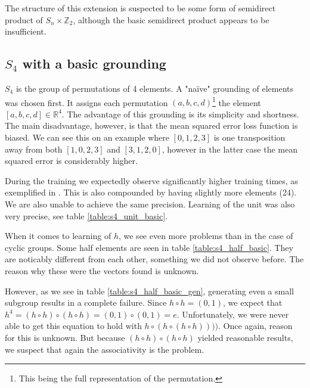 The structure of this extension is suspected to be some form of semidirect product of $S_n\times\mathbb{Z}_2$, although the basic semidirect product appears to be insufficient.

\subsection{$S_4$ with a basic grounding}

$S_4$ is the group of permutations of 4 elements. A "na\"{i}ve" grounding of elements was chosen first. It assigns each permutation $(a,b,c,d)$\footnote{This being the full representation of the permutation.} the element $[a,b,c,d]\in\mathbb{R}^4$. The advantage of this grounding is its simplicity and shortness. The main disadvantage, however, is that the mean squared error loss function is biased. We can see this on an example where $[0,1,2,3]$ is one transposition away from both $[1,0,2,3]$ and $[3,1,2,0]$, however in the latter case the mean squared error is considerably higher. 

During the training we expectedly observe significantly higher training times, as exemplified in . This is also compounded by having slightly more elements (24). We are also unable to achieve the same precision. Learning of the unit was also very precise, see table \ref{table:s4_unit_basic}.

When it comes to learning of $h$, we see even more problems than in the case of cyclic groups. Some half elements are seen in table \ref{table:s4_half_basic}. They are noticably different from each other, something we did not observe before. The reason why these were the vectors found is unknown. 

However, as we see in table \ref{table:s4_half_basic_gen}, generating even a small subgroup results in a complete failure. Since $h\circ h=(0,1)$, we expect that $h^4=(h\circ h)\circ(h\circ h)=(0,1)\circ(0,1)=e$. Unfortunately, we were never able to get this equation to hold with $h\circ(h\circ(h\circ h))))$. Once again, reason for this is unknown. But because $(h\circ h)\circ (h\circ h)$ yielded reasonable results, we suspect that again the associativity is the problem.

